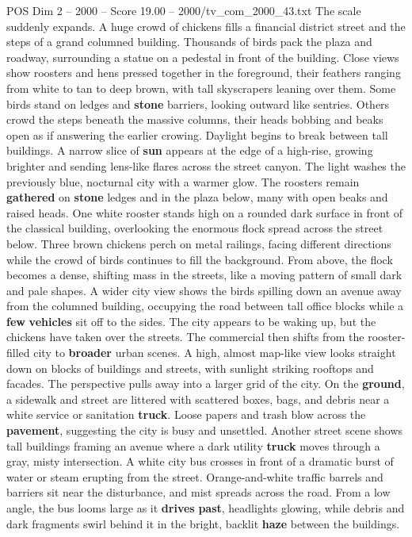\begin{textsample}{POS Dim 2 – 2000 – Score 19.00 – 2000/tv\_com\_2000\_43.txt}
The scale suddenly expands.
A huge crowd of chickens fills a financial district street and the steps of a grand columned building.
Thousands of birds pack the plaza and roadway, surrounding a statue on a pedestal in front of the building.
Close views show roosters and hens pressed together in the foreground, their feathers ranging from white to tan to deep brown, with tall skyscrapers leaning over them.
Some birds stand on ledges and \textbf{stone} barriers, looking outward like sentries.
Others crowd the steps beneath the massive columns, their heads bobbing and beaks open as if answering the earlier crowing.
Daylight begins to break between tall buildings.
A narrow slice of \textbf{sun} appears at the edge of a high-rise, growing brighter and sending lens-like flares across the street canyon.
The light washes the previously blue, nocturnal city with a warmer glow.
The roosters remain \textbf{gathered} on \textbf{stone} ledges and in the plaza below, many with open beaks and raised heads.
One white rooster stands high on a rounded dark surface in front of the classical building, overlooking the enormous flock spread across the street below.
Three brown chickens perch on metal railings, facing different directions while the crowd of birds continues to fill the background.
From above, the flock becomes a dense, shifting mass in the streets, like a moving pattern of small dark and pale shapes.
A wider city view shows the birds spilling down an avenue away from the columned building, occupying the road between tall office blocks while a \textbf{few} \textbf{vehicles} sit off to the sides.
The city appears to be waking up, but the chickens have taken over the streets.
The commercial then shifts from the rooster-filled city to \textbf{broader} urban scenes.
A high, almost map-like view looks straight down on blocks of buildings and streets, with sunlight striking rooftops and facades.
The perspective pulls away into a larger grid of the city.
On the \textbf{ground}, a sidewalk and street are littered with scattered boxes, bags, and debris near a white service or sanitation \textbf{truck}.
Loose papers and trash blow across the \textbf{pavement}, suggesting the city is busy and unsettled.
Another street scene shows tall buildings framing an avenue where a dark utility \textbf{truck} moves through a gray, misty intersection.
A white city bus crosses in front of a dramatic burst of water or steam erupting from the street.
Orange-and-white traffic barrels and barriers sit near the disturbance, and mist spreads across the road.
From a low angle, the bus looms large as it \textbf{drives} \textbf{past}, headlights glowing, while debris and dark fragments swirl behind it in the bright, backlit \textbf{haze} between the buildings.

\end{textsample}
